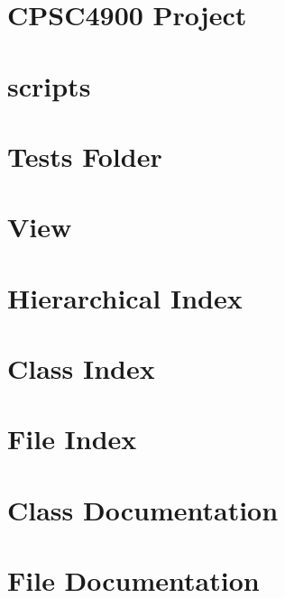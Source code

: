 \documentclass[twoside]{book}
\begin{document}
\chapter{C\-P\-S\-C4900 Project}
\label{md_readme}
\hypertarget{md_readme}{}

\chapter{scripts}
\label{md_scripts_readme}
\hypertarget{md_scripts_readme}{}

\chapter{Tests Folder}
\label{md_tests_readme}
\hypertarget{md_tests_readme}{}

\chapter{View}
\label{md_view_readme}
\hypertarget{md_view_readme}{}

\chapter{Hierarchical Index}

\chapter{Class Index}

\chapter{File Index}

\chapter{Class Documentation}


\chapter{File Documentation}











\newpage
{}
{}
\printindex
\end{document}
